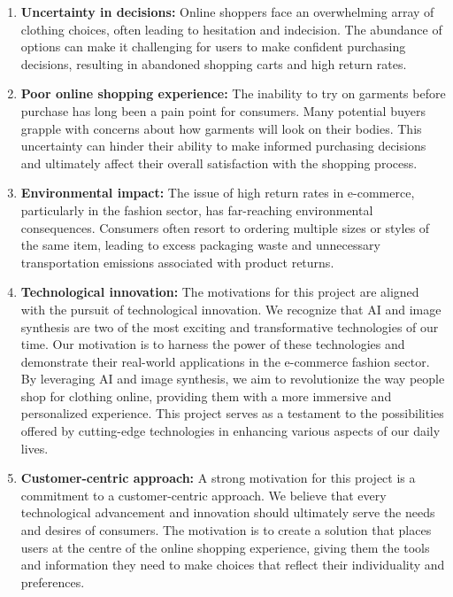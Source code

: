 	\begin{enumerate}
		\item \textbf{Uncertainty in decisions:} Online shoppers face an overwhelming array of clothing choices, often leading to hesitation and indecision. The abundance of options can make it challenging for users to make confident purchasing decisions, resulting in abandoned shopping carts and high return rates.
		\item \textbf{Poor online shopping experience:} The inability to try on garments before purchase has long been a pain point for consumers. Many potential buyers grapple with concerns about how garments will look on their bodies. This uncertainty can hinder their ability to make informed purchasing decisions and ultimately affect their overall satisfaction with the shopping process.
		\item \textbf{Environmental impact:} The issue of high return rates in e-commerce, particularly in the fashion sector, has far-reaching environmental consequences. Consumers often resort to ordering multiple sizes or styles of the same item, leading to excess packaging waste and unnecessary transportation emissions associated with product returns.
		\item \textbf{Technological innovation:} The motivations for this project are aligned with the pursuit of technological innovation. We recognize that AI and image synthesis are two of the most exciting and transformative technologies of our time. Our motivation is to harness the power of these technologies and demonstrate their real-world applications in the e-commerce fashion sector. By leveraging AI and image synthesis, we aim to revolutionize the way people shop for clothing online, providing them with a more immersive and personalized experience. This project serves as a testament to the possibilities offered by cutting-edge technologies in enhancing various aspects of our daily lives.
		\item \textbf{Customer-centric approach:} A strong motivation for this project is a commitment to a customer-centric approach. We believe that every technological advancement and innovation should ultimately serve the needs and desires of consumers. The motivation is to create a solution that places users at the centre of the online shopping experience, giving them the tools and information they need to make choices that reflect their individuality and preferences.
	\end{enumerate}
